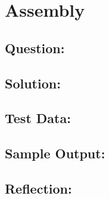 \documentclass[Lab-B.tex]{subfiles}
\begin{document}
    \section{Assembly}
        \subsection*{Question:}
            
        \subsection*{Solution:}

        \subsection*{Test Data:}
        
        \subsection*{Sample Output:}

        \subsection*{Reflection:}
\end{document}
